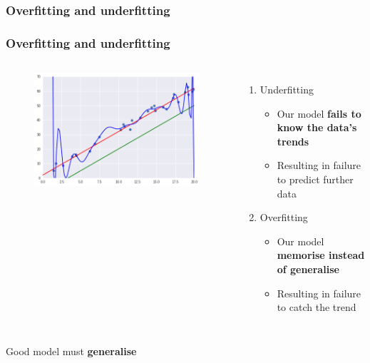 \documentclass[]{beamer}
\begin{document}
\subsubsection{Overfitting and underfitting}
\begin{frame}
	\frametitle{Overfitting and underfitting}
	\begin{columns}
		\begin{figure}
			\includegraphics[scale=.3]{imgs/linreg_2.png}
		\end{figure}
		\begin{enumerate}
			\item<2-> Underfitting
			      \begin{itemize}
				      \item<3-> Our model \textbf{fails to know the data's trends}
				      \item<4-> Resulting in failure to predict further data
			      \end{itemize}
			\item<5-> Overfitting
			      \begin{itemize}
				      \item<6-> Our model \textbf{memorise instead of generalise}
				      \item<7-> Resulting in failure to catch the trend
			      \end{itemize}
		\end{enumerate}
	\end{columns}
\end{frame}

\begin{frame}
	\begin{center}
		{\LARGE Good model must \textbf{generalise}}\\
	\end{center}
\end{frame}
\end{document}
